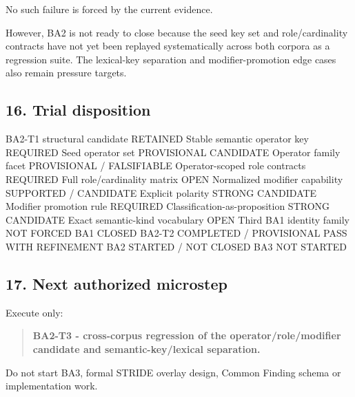\documentclass[
  10pt,
  letterpaper,
]{article}
\newenvironment{Shaded}{}{}
\newcommand{\NormalTok}[1]{#1}
\begin{document}
No such failure is forced by the current evidence.

However, BA2 is not ready to close because the seed key set and
role/cardinality contracts have not yet been replayed systematically
across both corpora as a regression suite. The lexical-key separation
and modifier-promotion edge cases also remain pressure targets.

\subsection{16. Trial disposition}\label{trial-disposition}

\begin{Shaded}
\begin{Highlighting}[]
\NormalTok{BA2{-}T1 structural candidate          RETAINED}
\NormalTok{Stable semantic operator key         REQUIRED}
\NormalTok{Seed operator set                    PROVISIONAL CANDIDATE}
\NormalTok{Operator family facet                PROVISIONAL / FALSIFIABLE}
\NormalTok{Operator{-}scoped role contracts       REQUIRED}
\NormalTok{Full role/cardinality matrix         OPEN}
\NormalTok{Normalized modifier capability       SUPPORTED / CANDIDATE}
\NormalTok{Explicit polarity                    STRONG CANDIDATE}
\NormalTok{Modifier promotion rule              REQUIRED}
\NormalTok{Classification{-}as{-}proposition        STRONG CANDIDATE}
\NormalTok{Exact semantic{-}kind vocabulary       OPEN}
\NormalTok{Third BA1 identity family            NOT FORCED}
\NormalTok{BA1                                  CLOSED}
\NormalTok{BA2{-}T2                               COMPLETED / PROVISIONAL PASS WITH REFINEMENT}
\NormalTok{BA2                                  STARTED / NOT CLOSED}
\NormalTok{BA3                                  NOT STARTED}
\end{Highlighting}
\end{Shaded}

\subsection{17. Next authorized
microstep}\label{next-authorized-microstep}

Execute only:

\begin{quote}
\textbf{BA2-T3 - cross-corpus regression of the operator/role/modifier
candidate and semantic-key/lexical separation.}
\end{quote}

Do not start BA3, formal STRIDE overlay design, Common Finding schema or
implementation work.
\end{document}
